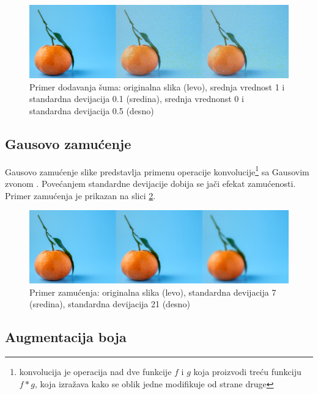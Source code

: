 \documentclass[12pt,oneside]{memoir}
\begin{document}
\begin{figure}[ht]
    \centering
    \includegraphics[width=1\textwidth]{matfmaster/glava3/noise.jpg}
    \caption{Primer dodavanja šuma:  originalna slika (levo), srednja vrednost 1 i standardna devijacija 0.1 (sredina), srednja vrednonst 0 i standardna devijacija 0.5 (desno) \cite{unsplashOrange}}
    \label{fig:section3_noise}
\end{figure}

\subsection{Gausovo zamućenje}
Gausovo zamućenje slike predstavlja primenu operacije konvolucije\footnote{konvolucija je operacija nad dve funkcije \(f\) i \(g\) koja proizvodi treću funkciju \(f*g\), koja izražava kako se oblik jedne modifikuje od strane druge} sa Gausovim zvonom \cite{ni2019}.
Povećanjem standardne devijacije dobija se jači efekat zamućenosti. Primer zamućenja je prikazan na slici \ref{fig:section3_blur}.
\begin{figure}[ht]
    \centering
    \includegraphics[width=1\textwidth]{matfmaster/glava3/blur.jpg}
    \caption{Primer zamućenja: originalna slika (levo), standardna devijacija 7 (sredina), standardna devijacija 21 (desno) \cite{unsplashOrange}} 
    \label{fig:section3_blur}
\end{figure}


\subsection{Augmentacija boja}
\end{document}
